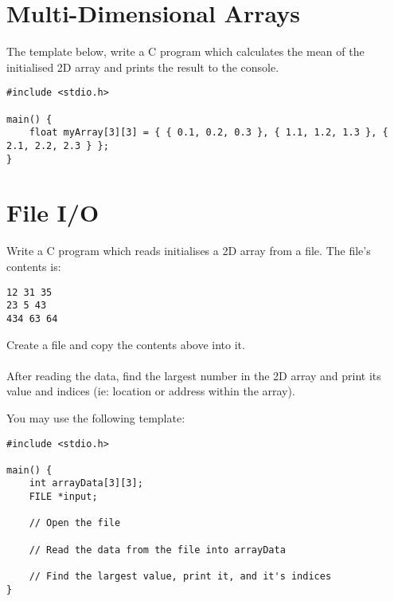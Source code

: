 \documentclass{lab}
\begin{document}
\pagebreak

\section{Multi-Dimensional Arrays}

\begin{task}{}{}
The template below, write a C program which calculates the mean of the initialised 2D array and prints the result to the console.

\begin{lstlisting}[style=Ctable]
#include <stdio.h>

main() {
	float myArray[3][3] = { { 0.1, 0.2, 0.3 }, { 1.1, 1.2, 1.3 }, { 2.1, 2.2, 2.3 } };
}
\end{lstlisting}
\end{task}


\section{File I/O}

\begin{task}{}{}
Write a C program which reads initialises a 2D array from a file. The file's contents is:

\begin{lstlisting}[style=Ctable]
12 31 35
23 5 43
434 63 64
\end{lstlisting}

Create a file and copy the contents above into it.\\~\\

After reading the data, find the largest number in the 2D array and print its value and indices (ie: location or address within the array).

You may use the following template:

\begin{lstlisting}[style=Ctable]
#include <stdio.h>

main() {
	int arrayData[3][3];
	FILE *input;
	
	// Open the file
	
	// Read the data from the file into arrayData
	
	// Find the largest value, print it, and it's indices
}
\end{lstlisting}
\end{task}
\end{document}
